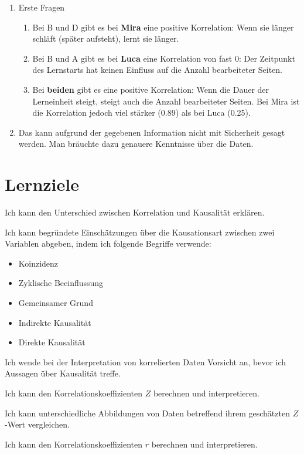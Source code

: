\begin{myexercise}
    \begin{myanswer}
        \begin{enumerate}
            \item Erste Fragen
                  \begin{enumerate}
                      \item Bei B und D gibt es bei \textbf{Mira} eine positive Korrelation: Wenn sie länger schläft (später aufsteht), lernt sie länger.
                      \item Bei B und A gibt es bei \textbf{Luca} eine Korrelation von fast 0: Der Zeitpunkt des Lernstarts hat keinen Einfluss auf die Anzahl bearbeiteter Seiten.
                      \item Bei \textbf{beiden} gibt es eine positive Korrelation: Wenn die Dauer der Lerneinheit steigt, steigt auch die Anzahl bearbeiteter Seiten. Bei Mira ist die Korrelation jedoch viel stärker (0.89) als bei Luca (0.25).
                  \end{enumerate}
            \item Das kann aufgrund der gegebenen Information nicht mit Sicherheit gesagt werden. Man bräuchte dazu genauere Kenntnisse über die Daten.
        \end{enumerate}
    \end{myanswer}
\end{myexercise}

\clearpage
\section{Lernziele}
\begin{todolist}
    \item Ich kann den Unterschied zwischen Korrelation und Kausalität erklären.
    \item Ich kann begründete Einschätzungen über die Kausationsart zwischen zwei Variablen abgeben, indem ich folgende Begriffe verwende:
    \begin{itemize}
        \item Koinzidenz
        \item Zyklische Beeinflussung
        \item Gemeinsamer Grund
        \item Indirekte Kausalität
        \item Direkte Kausalität
    \end{itemize}
    \item Ich wende bei der Interpretation von korrelierten Daten Vorsicht an, bevor ich Aussagen über Kausalität treffe.
    \item Ich kann den Korrelationskoeffizienten \( Z \) berechnen und interpretieren.
    \item Ich kann unterschiedliche Abbildungen von Daten betreffend ihrem geschätzten \(Z\)-Wert vergleichen.
    \item Ich kann den Korrelationskoeffizienten \( r \) berechnen und interpretieren.
\end{todolist}